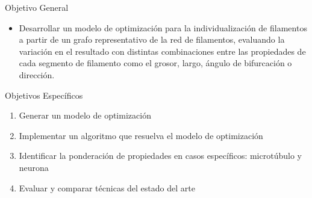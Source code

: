 \documentclass[]{beamer}
\begin{document}
\begin{frame}{Objetivo General}
\small
    \begin{itemize}
        \item Desarrollar un modelo de optimizaci\'on para la individualizaci\'on de filamentos a partir de un grafo representativo de la red de filamentos, evaluando la variaci\'on en el resultado con distintas combinaciones entre las propiedades de cada segmento de filamento como el grosor, largo, \'angulo de bifurcaci\'on o direcci\'on.
    \end{itemize}
\end{frame}


\begin{frame}{Objetivos Espec\'ificos}
\small
\begin{enumerate}
    \item Generar un modelo de optimizaci\'on %
    \item Implementar un algoritmo que resuelva el modelo de optimizaci\'on %
    \item Identificar la ponderaci\'on de propiedades en casos espec\'ificos: microt\'ubulo y neurona %
    \item Evaluar y comparar t\'ecnicas del estado del arte%
\end{enumerate}
    
\end{frame}



\end{document}
